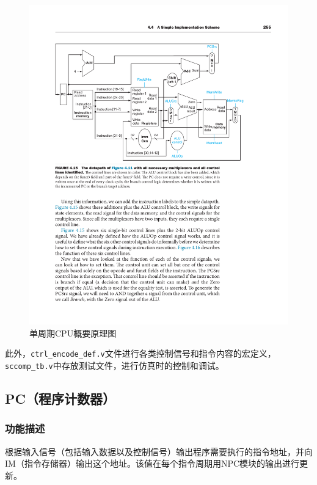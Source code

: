 \documentclass[UTF8,a4paper,autofakebold,15pt]{ctexart}
\begin{document}
\begin{figure}[ht]
	\centering
	\includegraphics{fig1.pdf}
	\caption{单周期CPU概要原理图\cite{ref1}}
	\label{fig:label1}
\end{figure}

此外，{\tt ctrl\_encode\_def.v}文件进行各类控制信号和指令内容的宏定义，{\tt sccomp\_tb.v}中存放测试文件，进行仿真时的控制和调试。

\subsection{PC（程序计数器）}

\subsubsection{功能描述}

	根据输入信号（包括输入数据以及控制信号）输出程序需要执行的指令地址，并向IM（指令存储器）输出这个地址。该值在每个指令周期用NPC模块的输出进行更新。
\end{document}
